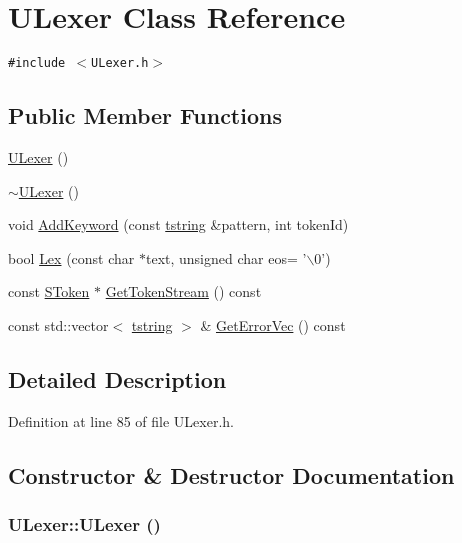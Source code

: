 \hypertarget{class_u_lexer}{
\section{ULexer Class Reference}
\label{class_u_lexer}
}
{\tt \#include $<$ULexer.h$>$}

\subsection*{Public Member Functions}
\begin{CompactItemize}
\item 
\hyperlink{class_u_lexer_b2b8fdaf494af52d93415808eb728b7b}{ULexer} ()
\item 
\hyperlink{class_u_lexer_6605340b309ce0685abd29a8a4ba56cb}{$\sim$ULexer} ()
\item 
void \hyperlink{class_u_lexer_5f459ae48c6e2bcb58e384fe08275853}{AddKeyword} (const \hyperlink{common__afx_8h_816fa58fd77499b0edb2c69ebe803d5c}{tstring} \&pattern, int tokenId)
\item 
bool \hyperlink{class_u_lexer_f083d8bf0bffa896c603117dddf34017}{Lex} (const char $\ast$text, unsigned char eos= '$\backslash$0')
\item 
const \hyperlink{struct_s_token}{SToken} $\ast$ \hyperlink{class_u_lexer_6402fd28ffe0217e7a86ce78fc943b79}{GetTokenStream} () const 
\item 
const std::vector$<$ \hyperlink{common__afx_8h_816fa58fd77499b0edb2c69ebe803d5c}{tstring} $>$ \& \hyperlink{class_u_lexer_24d10ce8753d4c9703a2b376ceeb1756}{GetErrorVec} () const 
\end{CompactItemize}


\subsection{Detailed Description}


Definition at line 85 of file ULexer.h.

\subsection{Constructor \& Destructor Documentation}
\hypertarget{class_u_lexer_b2b8fdaf494af52d93415808eb728b7b}{
\subsubsection[{ULexer}]{\setlength{\rightskip}{0pt plus 5cm}ULexer::ULexer ()}}
\label{class_u_lexer_b2b8fdaf494af52d93415808eb728b7b}




